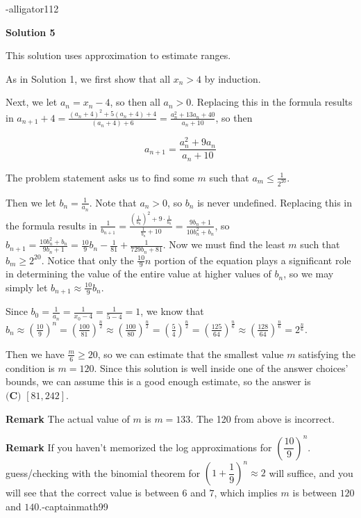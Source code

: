 \begin{enumerate}
 -alligator112

 



\textbf{Solution 5}

This solution uses approximation to estimate ranges.

 As in Solution 1, we first show that all $x_n>4$ by induction.

 Next, we let $a_n=x_n-4$, so then all $a_n>0$. Replacing this in the formula results in $a_{n+1}+4=\frac{(a_n+4)^2+5(a_n+4)+4}{(a_n+4)+6}=\frac{a_n^2+13a_n+40}{a_n+10}$, so then

 
 \[a_{n+1}=\frac{a_n^2+9a_n}{a_n+10}\]

 
The problem statement asks us to find some $m$ such that $a_m\le\frac{1}{2^{20}}$.

 Then we let $b_n=\frac{1}{a_n}$. Note that $a_n>0$, so $b_n$ is never undefined. Replacing this in the formula results in $\frac{1}{b_{n+1}}=\frac{\left(\frac{1}{b_n}\right)^2+9\cdot\frac{1}{b_n}}{\frac{1}{b_n}+10}=\frac{9b_n+1}{10b_n^2+b_n}$, so $b_{n+1}=\frac{10b_n^2+b_n}{9b_n+1}=\frac{10}{9}b_n-\frac{1}{81}+\frac{1}{729b_n+81}$. Now we must find the least $m$ such that $b_m\ge2^{20}$. Notice that only the $\frac{10}{9}n$ portion of the equation plays a significant role in determining the value of the entire value at higher values of $b_n$, so we may simply let $b_{n+1}\approx\frac{10}{9}b_n$. 

 Since $b_0=\frac{1}{a_n}=\frac{1}{x_0-4}=\frac{1}{5-4}=1$, we know that $b_n\approx\left(\frac{10}{9}\right)^n=\left(\frac{100}{81}\right)^{\frac{n}{2}}\approx\left(\frac{100}{80}\right)^{\frac{n}{2}}=\left(\frac{5}{4}\right)^{\frac{n}{2}}=\left(\frac{125}{64}\right)^{\frac{n}{6}}\approx\left(\frac{128}{64}\right)^{\frac{n}{6}}=2^{\frac{n}{6}}$.

 Then we have $\frac{m}{6}\ge20$, so we can estimate that the smallest value $m$ satisfying the condition is $m=120$. Since this solution is well inside one of the answer choices’ bounds, we can assume this is a good enough estimate, so the answer is $\boxed{\textbf{(C) } [81,242]}$.

 \textbf{Remark} The actual value of $m$ is $m=133$. The 120 from above is incorrect.

 \textbf{Remark} If you haven't memorized the log approximations for $({\dfrac{10}{9}})^{n}$. guess/checking with the binomial theorem for $(1+\dfrac{1}{9})^{n} \approx 2$ will suffice, and you will see that the correct value is between $6$ and $7$, which implies $m$ is between $120$ and $140$.-captainmath99


\end{enumerate}
